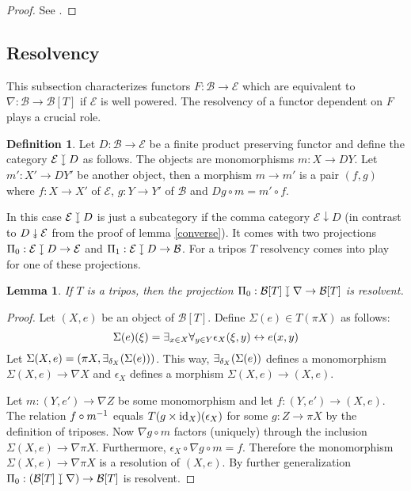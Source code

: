 \documentclass[sort&compress]{elsarticle}
\theoremstyle{plain}
\newtheorem{lemma}[theorem]{Lemma}
\theoremstyle{definition}
\newtheorem{defin}[theorem]{Definition}
\theoremstyle{remark}
\newcommand\cat\mathcal
\newcommand{\downmono}{\mathbin{\rotatebox[origin=c]{-90}{$\rightarrowtail$}}}
\newcommand{\downepi}{\mathbin{\rotatebox[origin=c]{-90}{$\twoheadrightarrow$}}}
\begin{document}
\begin{proof} See \citet[section 2.4]{MR2479466}. \end{proof}

\newcommand\sub{\mathsf{Sub}}
\subsection{Resolvency}
This subsection characterizes functors $F:\cat B\to\cat E$ which are equivalent to $\nabla: \cat B \to \cat B[T]$ if $\cat E$ is well powered. The resolvency of a functor dependent on $F$ plays a crucial role.

\begin{defin} Let $D:\cat B \to\cat E$ be a finite product preserving functor and define the category $\cat E\downmono D$ as follows. The objects are monomorphisms $m:X\to DY$. Let $m':X'\to DY'$ be another object, then a morphism $m \to m'$ is a pair $(f,g)$ where $f:X\to X'$ of $\cat E$, $g:Y\to Y'$ of $\cat B$ and $Dg\circ m = m'\circ f$. \end{defin}

In this case $\cat E\downmono D$ is just a subcategory if the comma category $\cat E\downarrow D$ (in contrast to $D\downepi \cat E$ from the proof of lemma \ref{converse}). It comes with two projections $\Pi_0:\cat E\downmono D \to\cat E$ and $\Pi_1:\cat E\downmono D \to\cat B$. For a tripos $T$ resolvency comes into play for one of these projections.

\begin{lemma} If $T$ is a tripos, then the projection $\Pi_0:\cat B[T]\downmono \nabla \to\cat B[T]$ is resolvent.\label{tripco} \end{lemma}

\begin{proof} Let $(X,e)$ be an object of $\cat B[T]$. Define $\Sigma(e) \in T(\pi X)$ as follows:
\[ \Sigma(e)(\xi) = \exists_{x\in X} \forall_{y\in Y} \epsilon_X(\xi,y) \leftrightarrow e(x,y)\]
Let $\Sigma(X,e) = (\pi X, \exists_{\delta_X}(\Sigma(e)))$. This way, $\exists_{\delta_X}(\Sigma(e))$ defines a monomorphism $\Sigma(X,e) \to \nabla X$ and $\epsilon_X$ defines a morphism $\Sigma(X,e) \to (X,e)$.

Let $m:(Y,e') \to \nabla Z$ be some monomorphism and let $f:(Y,e') \to (X,e)$. The relation $f\circ m^{-1}$ equals $T(g\times \mathrm{id}_X)(\epsilon_X)$ for some $g:Z\to \pi X$ by the definition of triposes.
Now $\nabla g\circ m$ factors (uniquely) through the inclusion $\Sigma(X,e) \to \nabla\pi X$.
Furthermore, $\epsilon_X\circ \nabla g\circ m = f$. Therefore the monomorphism $\Sigma(X,e) \to \nabla\pi X$ is a resolution of $(X,e)$. By further generalization $\Pi_0:(\cat B[T]\downmono \nabla)\to\cat B[T]$ is resolvent. \end{proof} %
\end{document}
